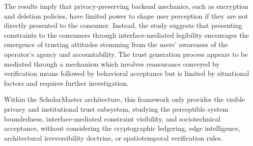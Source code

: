 \documentclass[conference]{IEEEtran}
\begin{document}
The results imply that privacy-preserving backend mechanics, such as encryption and deletion policies, have limited power to shape user perception if they are not directly presented to the consumer. Instead, the study suggests that presenting constraints to the consumers through interface-mediated legibility encourages the emergence of trusting attitudes stemming from the users’ awareness of the operator’s agency and accountability. The trust generation process appears to be mediated through a mechanism which involves reassurance conveyed by verification means followed by behavioral acceptance but is limited by situational factors and requires further investigation.

Within the ScholarMaster architecture, this framework only provides the visible privacy and institutional trust subsystem, studying the perceptible system boundedness, interface-mediated constraint visibility, and sociotechnical acceptance, without considering the cryptographic ledgering, edge intelligence, architectural irreversibility doctrine, or spatiotemporal verification rules.
\end{document}

